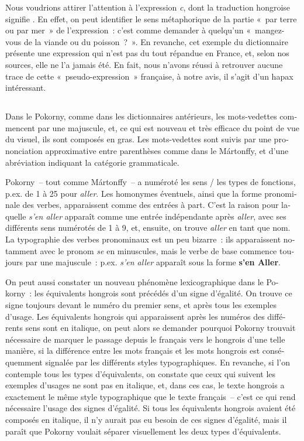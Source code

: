 \documentclass[output=paper,colorlinks,citecolor=brown,arabicfont,chinesefont,booklanguage=french]{langscibook}
\begin{document}
\begin{otherlanguage}{french}
Nous voudrions attirer l’attention à l’expression \emph{c}, dont la traduction hongroise signifie . En effet, on peut identifier le sens métaphorique de la partie «~par terre ou par mer~» de l’expression~: c’est comme demander à quelqu’un «~mangez-vous de la viande ou du poisson~?~». En revanche, cet exemple du dictionnaire présente une expression qui n’est pas du tout répandue en France, et, selon nos sources, elle ne l’a jamais été. En fait, nous n’avons réussi à retrouver aucune trace de cette «~pseudo-expression~» française, à notre avis, il s’agit d’un hapax intéressant.

\subsection{\citealt{Pokorny1880} }\label{sec:tillinger:3.4}

Dans le Pokorny, comme dans les dictionnaires antérieurs, les mots-vedettes commencent par une majuscule, et, ce qui est nouveau et très efficace du point de vue du visuel, ils sont composés en gras. Les mots-vedettes sont suivis par une prononciation approximative entre parenthèses comme dans le Mártonffy, et d’une abréviation indiquant la catégorie grammaticale.

Pokorny~-- tout comme Mártonffy~-- a numéroté les sens / les types de fonctions, p.ex. de 1 à 25 pour \emph{aller}. Les homonymes éventuels, ainsi que la forme pronominale des verbes, apparaissent comme des entrées à part. C’est la raison pour laquelle \emph{s’en aller} apparaît comme une entrée indépendante après \emph{aller}, avec ses différents sens numérotés de 1 à 9, et, ensuite, on trouve \emph{aller} en tant que nom. La typographie des verbes pronominaux est un peu bizarre~: ils apparaissent notamment avec le pronom \emph{se} en minuscules, mais le verbe de base commence toujours par une majuscule~: p.ex. \emph{s’en aller} apparaît sous la forme \textbf{s’en Aller}.

On peut aussi constater un nouveau phénomène lexicographique dans le Pokorny~: les équivalents hongrois sont précédés d’un signe d’égalité. On trouve ce signe toujours devant le numéro du premier sens, et après tous les exemples d’usage. Les équivalents hongrois qui apparaissent après les numéros des différents sens sont en italique, on peut alors se demander pourquoi Pokorny trouvait nécessaire de marquer le passage depuis le français vers le hongrois d’une telle manière, si la différence entre les mots français et les mots hongrois est conséquemment signalée par les différents styles typographiques. En revanche, si l’on contemple tous les types d’équivalents, on constate que ceux qui suivent les exemples d’usages ne sont pas en italique, et, dans ces cas, le texte hongrois a exactement le même style typographique que le texte français~-- c’est ce qui rend nécessaire l’usage des signes d’égalité. Si tous les équivalents hongrois avaient été composés en italique, il n’y aurait pas eu besoin de ces signes d’égalité, mais il paraît que Pokorny voulait séparer visuellement les deux types d’équivalents.


\end{otherlanguage}
\end{document}
